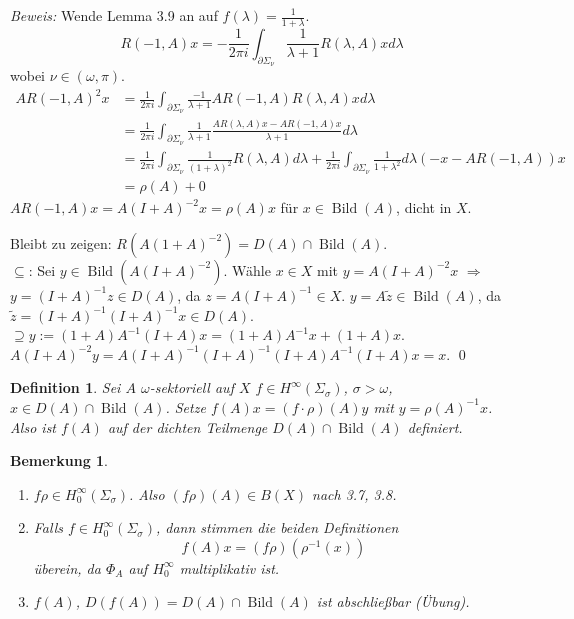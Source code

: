 \documentclass[12pt]{extreport} %
\newtheorem{Definition}[Satz]{Definition}
\newtheorem{Bemerkung}[Satz]{Bemerkung}
\DeclareMathOperator{\Bild}{Bild}
\numberwithin{equation}{section}
\newcommand{\om}{\omega}
\newcommand{\m}{\cdot}
\newcommand{\Bew}{\emph{Beweis: }}
\begin{document}
	 \Bew Wende Lemma 3.9 an auf $f(\lambda) = \frac{1}{1+\lambda}$.
	 $$R(-1,A)x = -\frac{1}{2\pi i} \int_{\partial \Sigma_\nu} \frac{1}{\lambda + 1} R(\lambda, A) x d\lambda$$
	 wobei $\nu\in (\om, \pi)$. 
	 \begin{align*}
	 	A R(-1,A)^2 x &= \frac{1}{2\pi i}\int_{\partial\Sigma_\nu} \frac{-1}{\lambda + 1} A R(-1, A) R(\lambda, A) xd\lambda\\
	 	&=  \frac{1}{2\pi i} \int_{\partial\Sigma_\nu} \frac{1}{\lambda + 1} \frac{AR(\lambda, A) x - A R(-1,A)x}{\lambda + 1} d\lambda\\
	 	&= \frac{1}{2\pi i} \int_{\partial\Sigma_\nu} \frac{1}{(1+\lambda)^2} R(\lambda, A) d\lambda + \frac{1}{2\pi i} \int_{\partial\Sigma_\nu} \frac{1}{1+\lambda^2}d\lambda (-x-AR(-1,A))x\\
	 	&= \rho(A) + 0
	 \end{align*}
	 $AR(-1,A) x = A(I+A)^{-2}x = \rho(A)x$ für $x\in \Bild(A)$, dicht in $X$.
	 
	 Bleibt zu zeigen: $R(A(1+A)^{-2}) = D(A)\cap \Bild(A)$.\\
	 \glqq $\subseteq$\grqq: Sei $y\in \Bild(A(I+A)^{-2})$. Wähle $x\in X$ mit $y= A(I+A)^{-2}x$ $\Rightarrow$ $y = (I+A)^{-1} z\in D(A)$, da $z= A(I+A)^{-1}\in X$. $y= A\tilde{z} \in \Bild(A)$, da $\tilde{z} = (I+A)^{-1}(I+A)^{-1}x\in D(A)$.\\
	 \glqq $\supseteq$\grqq $y:= (1+A) A^{-1}(I+A)x = (1+A)A^{-1}x + (1+A)x$. $A(I+A)^{-2}y = A(I+A)^{-1}(I+A)^{-1}(I+A)A^{-1} (I+A)x = x$.
	 \qed
	 
	 \begin{Definition}
	 	Sei $A$ $\om$-sektoriell auf $X$ $f\in H^\infty(\Sigma_\sigma)$, $\sigma> \om$, $x\in D(A)\cap \Bild(A)$. Setze $f(A)x = (f\m\rho)(A)y$ mit $y=\rho(A)^{-1}x$. Also ist $f(A)$ auf der dichten Teilmenge $D(A)\cap \Bild(A)$ definiert. 
	 \end{Definition}
	 
	 \begin{Bemerkung}
	 	\begin{enumerate}
	 		\item $f\rho\in H_0^\infty(\Sigma_\sigma)$. Also $(f\rho)(A)\in B(X)$ nach 3.7, 3.8. 
	 		\item Falls $f\in H_0^{\infty}(\Sigma_\sigma)$, dann stimmen die beiden Definitionen 
	 		$$f(A)x = (f\rho)(\rho^{-1}(x))$$
	 		überein, da $\Phi_A$ auf $H_0^\infty$ multiplikativ ist. 
	 		\item $f(A)$, $D(f(A)) = D(A)\cap \Bild(A)$ ist abschließbar (Übung).
	 	\end{enumerate}
	 \end{Bemerkung}
	 
\end{document}
